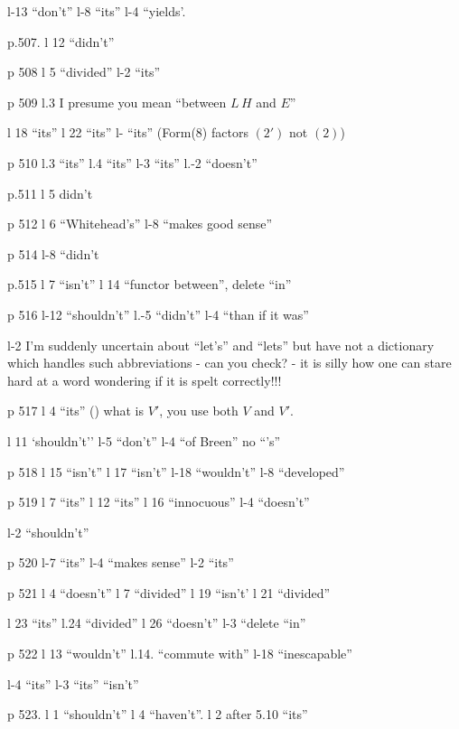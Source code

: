 l-13 ``don't'' \quad l-8 ``its'' \quad l-4 ``yields'.

p.507. l 12 ``didn't''

p 508 l 5 ``divided'' \quad l-2 ``its''

p 509 l.3 I presume you mean ``between $L\,H$ and $E$''

l 18 ``its'' \quad l 22 ``its'' \quad l- ``its'' \quad (Form(8) factors $(2')$ not $(2)$)

p 510 l.3 ``its'' \quad l.4 ``its'' \quad l-3 ``its'' \quad l.-2 ``doesn't''

p.511 l 5 didn't

p 512 l 6 ``Whitehead's'' \quad l-8 ``makes good sense''

p 514 l-8 ``didn't

p.515 l 7 ``isn't'' \quad l 14 ``functor between'', delete ``in''

p 516 l-12 ``shouldn't'' \quad l.-5 ``didn't'' \quad l-4 ``than if it was''

l-2 I'm suddenly uncertain about ``let's'' and ``lets'' but have not a dictionary which handles such abbreviations - can you check? - it is silly how one can stare hard at a  word wondering if it is spelt correctly!!!

p 517 l 4 ``its'' \quad () what is $V'$, you use both $V$ and $V'$.

l 11 `shouldn't'' \quad l-5 ``don't'' \quad l-4 ``of Breen'' no ``'s''

p 518 l 15 ``isn't'' \quad l 17 ``isn't'' \quad l-18 ``wouldn't'' \quad l-8 ``developed''

p 519 l 7 ``its'' \quad l 12 ``its'' \quad l 16 ``innocuous'' \quad l-4 ``doesn't''

l-2 ``shouldn't''

p 520 l-7 ``its'' \quad l-4 ``makes sense'' \quad l-2 ``its''

p 521 l 4 ``doesn't'' \quad l 7 ``divided'' \quad l 19 ``isn't' \quad l 21 ``divided''

l 23 ``its'' \quad l.24 ``divided'' \quad l 26 ``doesn't'' \quad l-3 ``delete ``in''

p 522 l 13 ``wouldn't'' \quad l.14. ``commute with'' \quad l-18 ``inescapable''

l-4 ``its'' \quad l-3 ``its'' ``isn't''

p 523. l 1 ``shouldn't'' \quad l 4 ``haven't''. \quad l 2 after 5.10 ``its''

